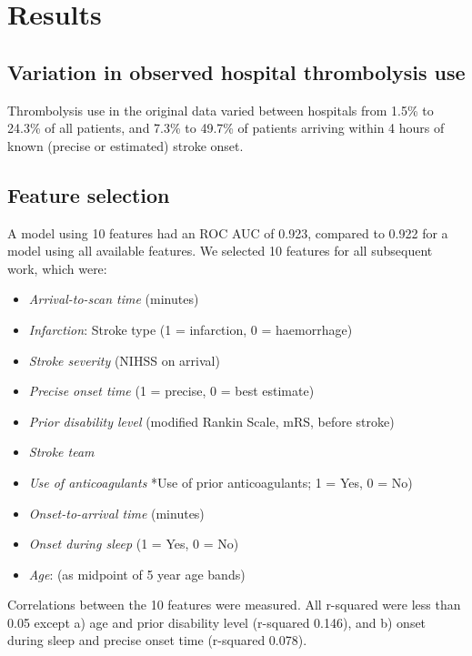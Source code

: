 \section{Results}

\subsection{Variation in observed hospital thrombolysis use}

Thrombolysis use in the original data varied between hospitals from 1.5\% to 24.3\% of all patients, and 7.3\% to 49.7\% of patients arriving within 4 hours of known (precise or estimated) stroke onset.


\subsection{Feature selection}

A model using  10 features had an ROC AUC of 0.923, compared to 0.922 for a model using all available features. We selected 10 features for all subsequent work, which were:

\begin{itemize}
    \item \emph{Arrival-to-scan time} (minutes)
    \item \emph{Infarction}: Stroke type (1 = infarction, 0 = haemorrhage)
    \item \emph{Stroke severity} (NIHSS on arrival)
    \item \emph{Precise onset time} (1 = precise, 0 = best estimate)
    \item \emph{Prior disability level} (modified Rankin Scale, mRS, before stroke)
    \item \emph{Stroke team}
    \item \emph{Use of anticoagulants} *Use of prior anticoagulants; 1 = Yes, 0 = No)
    \item \emph{Onset-to-arrival time} (minutes)
    \item \emph{Onset during sleep }(1 = Yes, 0 = No)
    \item \emph{Age}: (as midpoint of 5 year age bands)
\end{itemize}

Correlations between the 10 features were measured. All r-squared were less than 0.05 except a) age and prior disability level (r-squared 0.146), and b) onset during sleep and precise onset time (r-squared 0.078).

